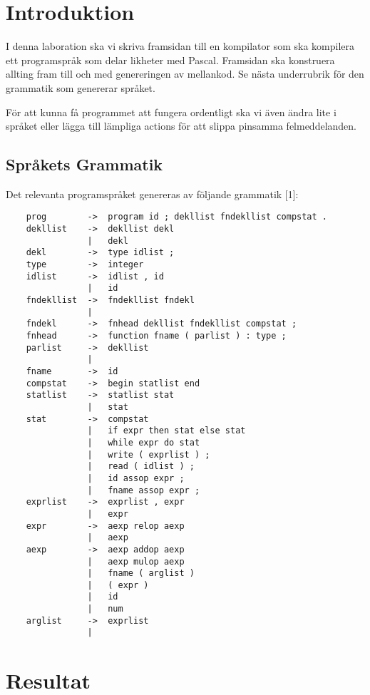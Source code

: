 \section{Introduktion}
I denna laboration ska vi skriva framsidan till en kompilator som ska kompilera ett programspråk som delar likheter med Pascal. Framsidan ska konstruera allting fram till och med genereringen av mellankod. Se nästa underrubrik för den grammatik som genererar språket. 

För att kunna få programmet att fungera ordentligt ska vi även ändra lite i språket eller lägga till lämpliga actions för att slippa pinsamma felmeddelanden. 


\newpage
\subsection{Språkets Grammatik}
Det relevanta programspråket genereras av följande grammatik [1]:
\begin{scriptsize}
\begin{verbatim}
    prog        ->  program id ; dekllist fndekllist compstat .
    dekllist    ->  dekllist dekl
                |   dekl
    dekl        ->  type idlist ;
    type        ->  integer
    idlist      ->  idlist , id
                |   id
    fndekllist  ->  fndekllist fndekl
                |   
    fndekl      ->  fnhead dekllist fndekllist compstat ;
    fnhead      ->  function fname ( parlist ) : type ;
    parlist     ->  dekllist
                |   
    fname       ->  id
    compstat    ->  begin statlist end
    statlist    ->  statlist stat
                |   stat
    stat        ->  compstat
                |   if expr then stat else stat
                |   while expr do stat
                |   write ( exprlist ) ;
                |   read ( idlist ) ;
                |   id assop expr ;
                |   fname assop expr ;
    exprlist    ->  exprlist , expr
                |   expr
    expr        ->  aexp relop aexp
                |   aexp
    aexp        ->  aexp addop aexp
                |   aexp mulop aexp
                |   fname ( arglist )
                |   ( expr )
                |   id
                |   num
    arglist     ->  exprlist
                |   
\end{verbatim}
\end{scriptsize}



\section{Resultat}

